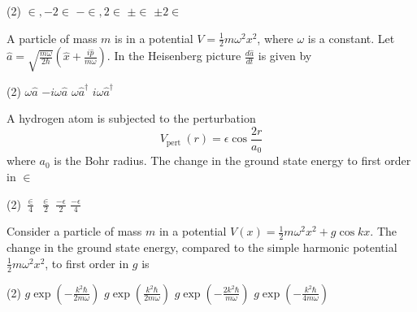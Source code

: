 \begin{enumerate}
\begin{minipage}{\textwidth}
\end{minipage}
\begin{tasks}(2)
	\task[\textbf{A.}] $\in,-2 \in$
	\task[\textbf{B.}] $-\in, 2 \in$
	\task[\textbf{C.}]$\pm \in$
	\task[\textbf{D.}]$\pm 2 \in$
\end{tasks}
\begin{minipage}{\textwidth}
	\item A particle of mass $m$ is in a potential $V=\frac{1}{2} m \omega^{2} x^{2}$, where $\omega$ is a constant. Let $\hat{a}=\sqrt{\frac{m \omega}{2 \hbar}}\left(\hat{x}+\frac{i \hat{p}}{m \omega}\right) .$ In the Heisenberg picture $\frac{d \hat{a}}{d t}$ is given by
\end{minipage}
\begin{tasks}(2)
	\task[\textbf{A.}] $\omega \hat{a}$
	\task[\textbf{B.}]$-i \omega \hat{a}$
	\task[\textbf{C.}]$\omega \hat{a}^{\dagger}$
	\task[\textbf{D.}]$i \omega \hat{a}^{\dagger}$
\end{tasks}
\begin{minipage}{\textwidth}
	\item A hydrogen atom is subjected to the perturbation
	$$
	V_{\text {pert }}(r)=\epsilon \cos \frac{2 r}{a_{0}}
	$$
	where $a_{0}$ is the Bohr radius. The change in the ground state energy to first order in $\in$
\end{minipage}
\begin{tasks}(2)
	\task[\textbf{A.}] $\frac{\in}{4}$
	\task[\textbf{B.}] $\frac{\in}{2}$
	\task[\textbf{C.}]$\frac{-\epsilon}{2}$
	\task[\textbf{D.}] $\frac{-\epsilon}{4}$
\end{tasks}
\begin{minipage}{\textwidth}
	\item Consider a particle of mass $m$ in a potential $V(x)=\frac{1}{2} m \omega^{2} x^{2}+g \cos k x .$ The change in the ground state energy, compared to the simple harmonic potential $\frac{1}{2} m \omega^{2} x^{2}$, to first order in $g$ is
\end{minipage}
\begin{tasks}(2)
	\task[\textbf{A.}] $g \exp \left(-\frac{k^{2} \hbar}{2 m \omega}\right)$
	\task[\textbf{B.}]$g \exp \left(\frac{k^{2} \hbar}{2 m \omega}\right)$
	\task[\textbf{C.}]$g \exp \left(-\frac{2 k^{2} \hbar}{m \omega}\right)$
	\task[\textbf{D.}] $g \exp \left(-\frac{k^{2} \hbar}{4 m \omega}\right)$
\end{tasks}
\begin{minipage}{\textwidth}

\end{minipage}
\end{enumerate}
